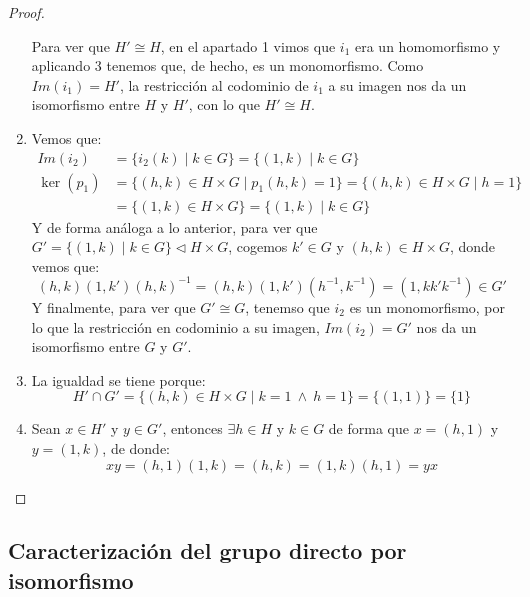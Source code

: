 \begin{prop}
\begin{proof}
\begin{enumerate}
            Para ver que $H'\cong H$, en el apartado 1 vimos que $i_1$ era un homomorfismo y aplicando 3 tenemos que, de hecho, es un monomorfismo. Como $Im(i_1) = H'$, la restricción al codominio de $i_1$ a su imagen nos da un isomorfismo entre $H$ y $H'$, con lo que $H'\cong H$.
            \item Vemos que:
                \begin{align*}
                    Im(i_2) &= \{i_2(k) \mid k\in G\} = \{(1,k) \mid k\in G\} \\
                    \ker(p_1) &= \{(h,k)\in H\times G \mid p_1(h,k) = 1\} = \{(h,k)\in H\times G \mid h=1\} \\ &= \{(1,k)\in H\times G\} = \{(1,k)\mid k\in G\}
                \end{align*}
                Y de forma análoga a lo anterior, para ver que $G'=\{(1,k)\mid k\in G\}\lhd H\times G$, cogemos $k'\in G$ y $(h,k)\in H\times G$, donde vemos que:
                \begin{equation*}
                    (h,k)(1,k'){(h,k)}^{-1} = (h,k)(1,k')\left(h^{-1},k^{-1}\right) = (1, kk'k^{-1}) \in G'
                \end{equation*}
                Y finalmente, para ver que $G'\cong G$, tenemso que $i_2$ es un monomorfismo, por lo que la restricción en codominio a su imagen, $Im(i_2) = G'$ nos da un isomorfismo entre $G$ y $G'$.
            \item La igualdad se tiene porque:
                \begin{equation*}
                    H'\cap G' = \{(h,k)\in H\times G \mid k = 1\ \land\ h = 1\} = \{(1,1)\} = \{1\}
                \end{equation*}
            \item Sean $x\in H'$ y $y\in G'$, entonces $\exists h\in H$ y $k\in G$ de forma que $x = (h,1)$ y $y = (1,k)$, de donde:
                \begin{equation*}
                    xy = (h,1)(1,k) = (h,k) = (1,k)(h,1) = yx
                \end{equation*}
        \end{enumerate}
    \end{proof}
\end{prop}

\subsection{Caracterización del grupo directo por isomorfismo}

